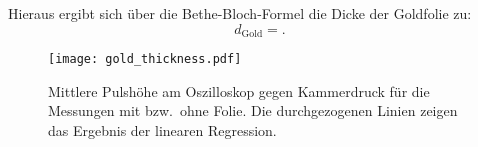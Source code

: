 Hieraus ergibt sich über die Bethe-Bloch-Formel die Dicke der Goldfolie zu:
\begin{equation}
  d_\text{Gold} =  .
\end{equation}

\begin{figure}
  \centering
  \texttt{[image: gold\_thickness.pdf]}
  \caption{%
    Mittlere Pulshöhe am Oszilloskop gegen Kammerdruck für die Messungen mit bzw.\ ohne Folie.
    Die durchgezogenen Linien zeigen das Ergebnis der linearen Regression.%
  }\label{fig:thickness}
\end{figure}
